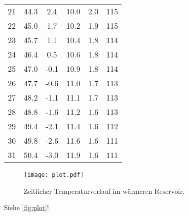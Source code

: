 \begin{table}[H]
\begin{tabular}{S[table-format=2.0] S S S S S[table-format=3.0]}
    21 & 44.3 &  2.4 & 10.0 & 2.0 & 115 \\
    22 & 45.0 &  1.7 & 10.2 & 1.9 & 115 \\
    23 & 45.7 &  1.1 & 10.4 & 1.8 & 114 \\
    24 & 46.4 &  0.5 & 10.6 & 1.8 & 114 \\
    25 & 47.0 & {-0.1} & 10.9 & 1.8 & 114 \\
    26 & 47.7 & {-0.6} & 11.0 & 1.7 & 113 \\
    27 & 48.2 & {-1.1} & 11.1 & 1.7 & 113 \\
    28 & 48.8 & {-1.6} & 11.2 & 1.6 & 113 \\
    29 & 49.4 & {-2.1} & 11.4 & 1.6 & 112 \\
    30 & 49.8 & {-2.6} & 11.6 & 1.6 & 111 \\
    31 & 50.4 & {-3.0} & 11.9 & 1.6 & 111 \\
    \bottomrule
  \end{tabular}
\end{table}


\begin{figure}
  \centering
  \texttt{[image: plot.pdf]}
  \caption{Zeitlicher Temperaturverlauf im wärmeren Reservoir.}
  \label{fig:plot}
\end{figure}


Siehe \autoref{fig:plot}!
